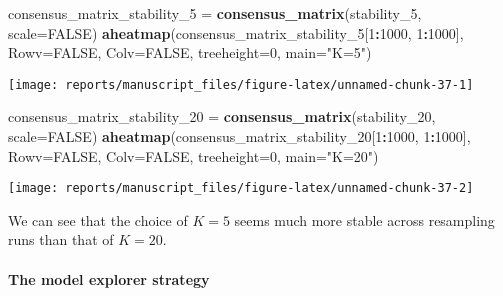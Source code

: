 \documentclass[9pt,a4paper,]{extarticle}
\newenvironment{Shaded}{\begin{snugshade}}{\end{snugshade}}
\newcommand{\DataTypeTok}[1]{\textcolor[rgb]{0.13,0.29,0.53}{#1}}
\newcommand{\DecValTok}[1]{\textcolor[rgb]{0.00,0.00,0.81}{#1}}
\newcommand{\KeywordTok}[1]{\textcolor[rgb]{0.13,0.29,0.53}{\textbf{#1}}}
\newcommand{\NormalTok}[1]{#1}
\newcommand{\OperatorTok}[1]{\textcolor[rgb]{0.81,0.36,0.00}{\textbf{#1}}}
\newcommand{\OtherTok}[1]{\textcolor[rgb]{0.56,0.35,0.01}{#1}}
\newcommand{\StringTok}[1]{\textcolor[rgb]{0.31,0.60,0.02}{#1}}
\begin{document}
\begin{Shaded}
\begin{Highlighting}[]
\NormalTok{consensus_matrix_stability_}\DecValTok{5}\NormalTok{ =}\StringTok{ }\KeywordTok{consensus_matrix}\NormalTok{(stability_}\DecValTok{5}\NormalTok{,}
                        \DataTypeTok{scale=}\OtherTok{FALSE}\NormalTok{)}
\KeywordTok{aheatmap}\NormalTok{(consensus_matrix_stability_}\DecValTok{5}\NormalTok{[}\DecValTok{1}\OperatorTok{:}\DecValTok{1000}\NormalTok{, }\DecValTok{1}\OperatorTok{:}\DecValTok{1000}\NormalTok{], }\DataTypeTok{Rowv=}\OtherTok{FALSE}\NormalTok{,}
     \DataTypeTok{Colv=}\OtherTok{FALSE}\NormalTok{,}
     \DataTypeTok{treeheight=}\DecValTok{0}\NormalTok{, }\DataTypeTok{main=}\StringTok{"K=5"}\NormalTok{)}
\end{Highlighting}
\end{Shaded}

\begin{center}\texttt{[image: reports/manuscript\_files/figure-latex/unnamed-chunk-37-1]} \end{center}

\begin{Shaded}
\begin{Highlighting}[]
\NormalTok{consensus_matrix_stability_}\DecValTok{20}\NormalTok{ =}\StringTok{ }\KeywordTok{consensus_matrix}\NormalTok{(stability_}\DecValTok{20}\NormalTok{,}
                         \DataTypeTok{scale=}\OtherTok{FALSE}\NormalTok{)}
\KeywordTok{aheatmap}\NormalTok{(consensus_matrix_stability_}\DecValTok{20}\NormalTok{[}\DecValTok{1}\OperatorTok{:}\DecValTok{1000}\NormalTok{, }\DecValTok{1}\OperatorTok{:}\DecValTok{1000}\NormalTok{], }\DataTypeTok{Rowv=}\OtherTok{FALSE}\NormalTok{,}
     \DataTypeTok{Colv=}\OtherTok{FALSE}\NormalTok{,}
     \DataTypeTok{treeheight=}\DecValTok{0}\NormalTok{, }\DataTypeTok{main=}\StringTok{"K=20"}\NormalTok{)}
\end{Highlighting}
\end{Shaded}

\begin{center}\texttt{[image: reports/manuscript\_files/figure-latex/unnamed-chunk-37-2]} \end{center}

We can see that the choice of \(K=5\) seems much more stable across resampling runs than that of \(K=20\).

\hypertarget{the-model-explorer-strategy}{%
\paragraph{The model explorer strategy}\label{the-model-explorer-strategy}}
\end{document}
